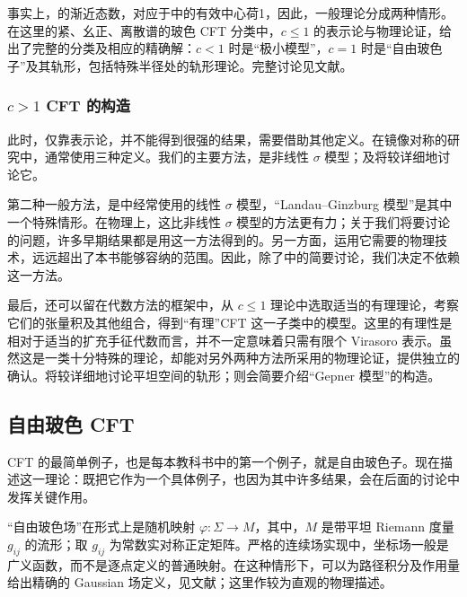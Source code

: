 事实上，的渐近态数，对应于中的有效中心荷1，因此，一般理论分成两种情形。在这里的紧、幺正、离散谱的玻色 CFT 分类中，$c\le1$ 的表示论与物理论证，给出了完整的分类及相应的精确解：$c<1$ 时是“极小模型”，$c=1$ 时是“自由玻色子”及其轨形，包括特殊半径处的轨形理论。完整讨论见文献。

\subsubsection{\texorpdfstring{$c>1$}{c>1} CFT 的构造}\label{sec:3.2.2.5}

此时，仅靠表示论，并不能得到很强的结果，需要借助其他定义。在镜像对称的研究中，通常使用三种定义。我们的主要方法，是非线性 $\sigma$ 模型；及将较详细地讨论它。

第二种一般方法，是中经常使用的线性 $\sigma$ 模型，“Landau--Ginzburg 模型”是其中一个特殊情形。在物理上，这比非线性 $\sigma$ 模型的方法更有力；关于我们将要讨论的问题，许多早期结果都是用这一方法得到的。另一方面，运用它需要的物理技术，远远超出了本书能够容纳的范围。因此，除了中的简要讨论，我们决定不依赖这一方法。

最后，还可以留在代数方法的框架中，从 $c\le1$ 理论中选取适当的有理理论，考察它们的张量积及其他组合，得到“有理”CFT 这一子类中的模型。这里的有理性是相对于适当的扩充手征代数而言，并不一定意味着只需有限个 Virasoro 表示。虽然这是一类十分特殊的理论，却能对另外两种方法所采用的物理论证，提供独立的确认。将较详细地讨论平坦空间的轨形；则会简要介绍“Gepner 模型”的构造。

\subsection{自由玻色 CFT}\label{sec:3.2.3}

CFT 的最简单例子，也是每本教科书中的第一个例子，就是自由玻色子。现在描述这一理论：既把它作为一个具体例子，也因为其中许多结果，会在后面的讨论中发挥关键作用。

“自由玻色场”在形式上是随机映射 $\varphi\colon\Sigma\to M$，其中，$M$ 是带平坦 Riemann 度量 $g_{ij}$ 的流形；取 $g_{ij}$ 为常数实对称正定矩阵。严格的连续场实现中，坐标场一般是广义函数，而不是逐点定义的普通映射。在这种情形下，可以为路径积分及作用量给出精确的 Gaussian 场定义，见文献；这里作较为直观的物理描述。

